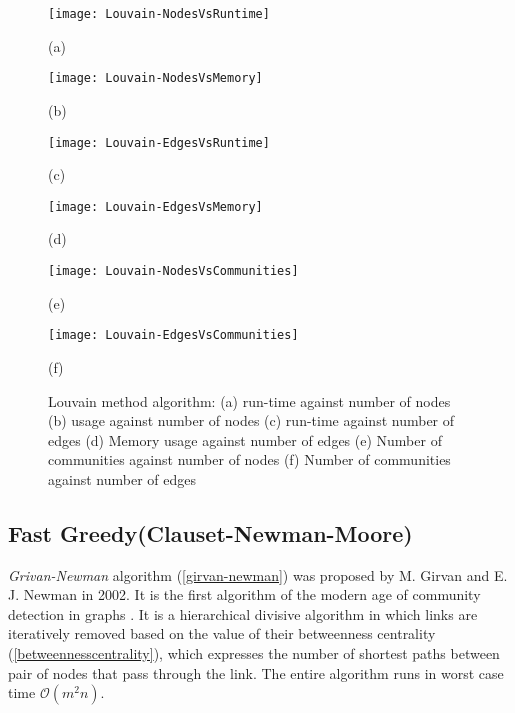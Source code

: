\vfill
\pagebreak

\begin{figure}[H]
  \centering
  \begin{minipage}[b]{0.4\textwidth}
    \texttt{[image: Louvain-NodesVsRuntime]}
    \caption*{(a)}
  \end{minipage}
  \begin{minipage}[b]{0.4\textwidth}
    \texttt{[image: Louvain-NodesVsMemory]}
    \caption*{(b)}
  \end{minipage}
%
  \begin{minipage}[b]{0.4\textwidth}
    \texttt{[image: Louvain-EdgesVsRuntime]}
    \caption*{(c)}
  \end{minipage}
  \begin{minipage}[b]{0.4\textwidth}
    \texttt{[image: Louvain-EdgesVsMemory]}
    \caption*{(d)}
  \end{minipage}
%
  \begin{minipage}[b]{0.4\textwidth}
    \texttt{[image: Louvain-NodesVsCommunities]}
    \caption*{(e)}
  \end{minipage}
  \begin{minipage}[b]{0.4\textwidth}
    \texttt{[image: Louvain-EdgesVsCommunities]}
    \caption*{(f)}
  \end{minipage}
  \caption{Louvain method algorithm: (a) run-time against number of nodes (b) usage against number of nodes (c) run-time against number of edges (d) Memory usage against number of edges (e) Number of communities against number of nodes (f) Number of communities against number of edges}
  \label{fig:louvain-runs}
\end{figure}

\subsection{Fast Greedy(Clauset-Newman-Moore)}
\textit{Grivan-Newman} algorithm (\ref{girvan-newman}) was proposed by M. Girvan and E. J. Newman in 2002. It is the first algorithm of the modern age of community detection in graphs \cite{ref-51}. It is a hierarchical divisive algorithm in which links are iteratively removed based on the value of their betweenness centrality (\ref{betweennesscentrality}), which expresses the number of shortest paths between pair of nodes that pass through the link. The entire algorithm runs in worst case time $\mathcal{O}(m^2n)$.
 
